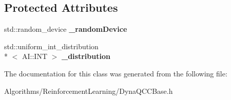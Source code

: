 \subsection*{Protected Attributes}
\begin{DoxyCompactItemize}
\item 
\hypertarget{classAI_1_1Algorithm_1_1DynaQCCBase_a0826c4c68c5d7b11bcb560d1b23b3252}{std\-::random\-\_\-device {\bfseries \-\_\-random\-Device}}\label{classAI_1_1Algorithm_1_1DynaQCCBase_a0826c4c68c5d7b11bcb560d1b23b3252}

\item 
\hypertarget{classAI_1_1Algorithm_1_1DynaQCCBase_ab2859ca39decdd0a8921e0ac500ed6f3}{std\-::uniform\-\_\-int\-\_\-distribution\\*
$<$ A\-I\-::\-I\-N\-T $>$ {\bfseries \-\_\-distribution}}\label{classAI_1_1Algorithm_1_1DynaQCCBase_ab2859ca39decdd0a8921e0ac500ed6f3}

\end{DoxyCompactItemize}


The documentation for this class was generated from the following file\-:\begin{DoxyCompactItemize}
\item 
Algorithms/\-Reinforcement\-Learning/Dyna\-Q\-C\-C\-Base.\-h\end{DoxyCompactItemize}
